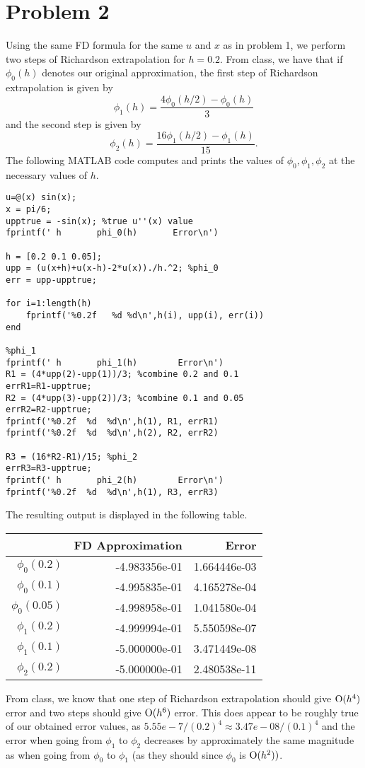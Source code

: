 \documentclass{article}
\begin{document}
\section{Problem 2}
Using the same FD formula for the same $u$ and $x$ as in problem 1, we perform two steps of Richardson extrapolation for $h=0.2$. From class, we have that if $\phi_0(h)$ denotes our original approximation, the first step of Richardson extrapolation is given by 
\[
\phi_1(h)=\frac{4\phi_0(h/2)-\phi_0(h)}{3}
\]
and the second step is given by 
\[
\phi_2(h)=\frac{16\phi_1(h/2)-\phi_1(h)}{15}.
\]
The following MATLAB code computes and prints the values of $\phi_0,\phi_1,\phi_2$ at the necessary values of $h$.
\begin{verbatim}
u=@(x) sin(x);
x = pi/6;
upptrue = -sin(x); %true u''(x) value
fprintf(' h       phi_0(h)       Error\n')

h = [0.2 0.1 0.05];
upp = (u(x+h)+u(x-h)-2*u(x))./h.^2; %phi_0
err = upp-upptrue;

for i=1:length(h)
    fprintf('%0.2f   %d %d\n',h(i), upp(i), err(i))
end

%phi_1
fprintf(' h       phi_1(h)        Error\n')
R1 = (4*upp(2)-upp(1))/3; %combine 0.2 and 0.1
errR1=R1-upptrue;
R2 = (4*upp(3)-upp(2))/3; %combine 0.1 and 0.05
errR2=R2-upptrue;
fprintf('%0.2f  %d  %d\n',h(1), R1, errR1)
fprintf('%0.2f  %d  %d\n',h(2), R2, errR2)

R3 = (16*R2-R1)/15; %phi_2
errR3=R3-upptrue;
fprintf(' h       phi_2(h)        Error\n')
fprintf('%0.2f  %d  %d\n',h(1), R3, errR3)
\end{verbatim}
The resulting output is displayed in the following table. 
\begin{table}[H]\centering
\begin{tabular}{|r|r|r|} \hline
& {FD Approximation} & {Error} \\ \hline
$\phi_0(0.2)$   &-4.983356e-01  &1.664446e-03\\
$\phi_0(0.1)$   &-4.995835e-01  &4.165278e-04\\
$\phi_0(0.05)$   &-4.998958e-01  &1.041580e-04\\ \hline
$\phi_1(0.2)$  &-4.999994e-01  &5.550598e-07\\
$\phi_1(0.1)$ &-5.000000e-01  &3.471449e-08\\ \hline
$\phi_2(0.2)$  &-5.000000e-01  &2.480538e-11\\ \hline
\end{tabular}
\end{table}
From class, we know that one step of Richardson extrapolation should give $\operatorname{O}(h^4)$ error and two steps should give $\operatorname{O}(h^6)$ error. This does appear to be roughly true of our obtained error values, as $5.55e-7/(0.2)^4\approx3.47e-08/(0.1)^4$ and the error when going from $\phi_1$ to $\phi_2$ decreases by approximately the same magnitude as when going from $\phi_0$ to $\phi_1$ (as they should since $\phi_0$ is $\operatorname{O}(h^2))$.
\end{document}
